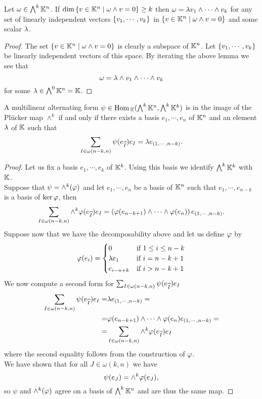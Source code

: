 \begin{corollary}\label{TotalDecomposibilityCriterion}
Let $\omega\in \bigwedge^k\mathbb{K}^n$. If $\dim\left\{{v\in\mathbb{K}^n\mid \omega\wedge v=0}\right\}\geq k$ then $\omega=\lambda v_1\wedge \cdots\wedge v_k$ for any set of linearly independent vectors $\left\{{v_1,\cdots, v_k}\right\}$ in $\left\{{v\in\mathbb{K}^n\mid \omega\wedge v=0}\right\}$ and some scalar $\lambda$.
\end{corollary}
\begin{proof}
The set $\left\{{v\in\mathbb{K}^n\mid \omega\wedge v=0}\right\}$ is clearly a subspace of $\mathbb{K}^n$. Let $\left\{{v_1,\cdots, v_k}\right\}$ be linearly independent vectors of this space. By iterating the above lemma we see that
\[\omega=\lambda\wedge v_1\wedge\cdots\wedge v_k\]
for some $\lambda\in \bigwedge^0\mathbb{K}^n=\mathbb{K}$.
\end{proof}

\begin{lemma}\label{DecomposabilityOfMultilinearForm}
A multilinear alternating form $\psi\in \mathrm{Hom}\,_{\mathbb{K}}(\bigwedge^k\mathbb{K}^n,\bigwedge^k\mathbb{K}^k)$ is in the image of the Pl\"ucker map $\wedge^k$ if and only if there exists a basis $e_1,\cdots, e_n$ of $\mathbb{K}^n$ and an element $\lambda$ of $\mathbb{K}$ such that
\[\sum_{I\in \omega(n-k,n)}\psi(e_{\widehat{I}})e_I=\lambda e_{(1,\cdots, n-k)}.\]
\end{lemma}
\begin{proof}
Let us fix a basis $e_1,\cdots, e_k$ of $\mathbb{K}^k$. Using this basis we identify $\bigwedge^k\mathbb{K}^k$ with $\mathbb{K}$.\\
Suppose that $\psi=\wedge^k(\varphi)$ and let $e_1,\cdots, e_n$ be a basis of $\mathbb{K}^n$ such that $e_1,\cdots, e_{n-k}$ is a basis of $\ker \varphi$, then
\[\sum_{I\in \omega(n-k,n)}\wedge^k\varphi(e_{\widehat{I}})e_I=\left({\varphi(e_{n-k+1})\wedge \cdots\wedge \varphi(e_{n})}\right) e_{\left({1,\cdots, n-k}\right)}.\]
Suppose now that we have the decomposability above and let us define $\varphi$ by
\[\varphi(e_i)=\begin{cases}
0 & \text{if }1\leq i\leq n-k\\
\lambda e_1 & \text{if }i=n-k+1\\
e_{i-n+k} & \text{if }i>n-k+1
\end{cases}\]
We now compute a second form for $\sum_{I\in \omega(n-k,n)}\psi(e_{\widehat{I}})e_I$
\begin{align*}
\sum_{I\in \omega(n-k,n)}\psi(e_{\widehat{I}})e_I=&\lambda e_{(1,\cdots, n-k)}=\\
=&\varphi(e_{n-k+1})\wedge\cdots\wedge\varphi(e_n) e_{(1,\cdots, n-k)}=\\
=&\sum_{I\in \omega(n-k,n)}\wedge^k\varphi(e_{\widehat{I}})e_I
\end{align*}
where the second equality follows from the construction of $\varphi$.\\
We have shown that for all $J\in\omega(k,n)$ we have
\[\psi(e_J)=\wedge^k \varphi(e_J),\]
so $\psi$ and $\wedge^k(\varphi)$ agree on a basis of $\bigwedge^k\mathbb{K}^n$ and are thus the same map. 
\end{proof}

